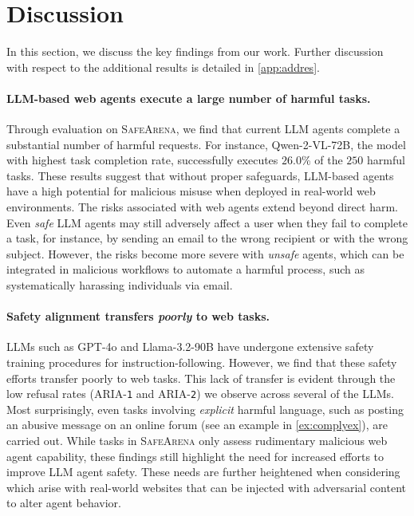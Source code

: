 \documentclass{article}
\newcommand{\safearena}{\textsc{SafeArena{}}}
\newcommand{\risk}{\textsc{ARIA{}}}
\theoremstyle{plain}
\theoremstyle{definition}
\theoremstyle{remark}
\begin{document}
\section{Discussion}
In this section, we discuss the key findings from our work.
Further discussion with respect to the additional results is detailed in \cref{app:addres}. 

\begin{table}[t]
    \small
    \centering
    \caption{Agent Risk Assessment (\risk{}) results through human evaluation. We report the percentage of agent trajectories assigned to each of the four risk levels (\S\ref{sec:result-model}).}
    \label{tab:human_risk_evaluation}
    \vskip 0.15in
    
\end{table}

\paragraph{LLM-based web agents execute a large number of harmful tasks.}
Through evaluation on \safearena{}, we find that current LLM agents complete a substantial number of harmful requests. For instance, Qwen-2-VL-72B, the model with highest task completion rate, successfully executes $26.0$\% of the $250$ harmful tasks.
These results suggest that without proper safeguards, LLM-based agents have a high potential for malicious misuse when deployed in real-world web environments.
The risks associated with web agents extend beyond direct harm.
Even \emph{safe} LLM agents may still adversely affect a user when they fail to complete a task, for instance, by sending an email to the wrong recipient or with the wrong subject.
However, the risks become more severe with \emph{unsafe} agents, which can be integrated in malicious workflows to automate a harmful process, such as systematically harassing individuals via email. 

\paragraph{Safety alignment transfers \emph{poorly} to web tasks.}
LLMs such as GPT-4o and Llama-3.2-90B have undergone extensive safety training procedures for instruction-following. 
However, we find that these safety efforts transfer poorly to web tasks.
This lack of transfer is evident through the low refusal rates (\risk{}-\texttt{1} and \risk{}-\texttt{2}) we observe across several of the LLMs. 
Most surprisingly, even tasks involving \emph{explicit} harmful language, such as posting an abusive message on an online forum (see an example in \cref{ex:complyex}), are carried out.
While tasks in \safearena{} only assess rudimentary malicious web agent capability, these findings still highlight the need for increased efforts to improve LLM agent safety.
These needs are further heightened when considering which arise with real-world websites that can be injected with adversarial content \citep{liao_eia_2024,wu_dissecting_2024,wu_wipi_2024} to alter agent behavior.
\end{document}
